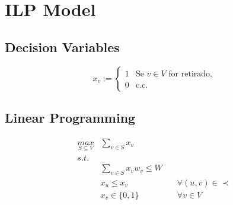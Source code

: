\section*{ILP Model}

\subsection*{Decision Variables}

\begin{equation}
    x_v :=  \begin{cases}
      1 & \mbox{Se $v \in V$ for retirado,} \\
      0 & \mbox{c.c.}
   \end{cases} \nonumber
\end{equation}

\setlength\parindent{72pt}
\subsection*{Linear Programming}

\begin{eqnarray}
    \label{constraint:stacking}
	\underset{S \subseteq V}{max} & \sum\limits_{v \in S} x_v \\
	s.t. & \nonumber\\
		 & \displaystyle\sum\limits_{v \in S} x_v w_v \leq W\\
		 & x_u \leq x_v  & \quad \forall (u,v) \in \prec \\
		 & x_v \in \{0,1\} & \quad \forall v \in V
\end{eqnarray}

